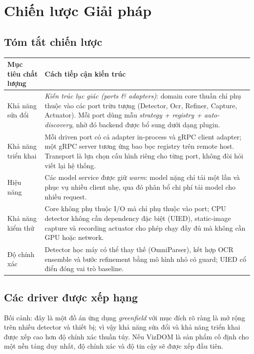 \documentclass[11pt,a4paper]{report}
\begin{document}
\chapter{Chiến lược Giải pháp}
\section{Tóm tắt chiến lược}
\begin{longtable}{@{}p{3.4cm}p{11.2cm}@{}}
\toprule
\textbf{Mục tiêu chất lượng} & \textbf{Cách tiếp cận kiến trúc} \\
\midrule
\endhead
Khả năng sửa đổi & \emph{Kiến trúc lục giác (ports \& adapters)}: domain core thuần chỉ phụ thuộc vào các port trừu tượng (Detector, Ocr, Refiner, Capture, Actuator). Mỗi port dùng mẫu \emph{strategy + registry + auto-discovery}, nhờ đó backend được bổ sung dưới dạng plugin. \\
Khả năng triển khai & Mỗi driven port có cả adapter in-process và gRPC client adapter; một gRPC server tương ứng bao bọc registry trên remote host. Transport là lựa chọn cấu hình riêng cho từng port, không đòi hỏi viết lại hệ thống. \\
Hiệu năng & Các model service được giữ \emph{warm}: model nặng chỉ tải một lần và phục vụ nhiều client nhẹ, qua đó phân bổ chi phí tải model cho nhiều request. \\
Khả năng kiểm thử & Core không phụ thuộc I/O mà chỉ phụ thuộc vào port; CPU detector không cần dependency đặc biệt (UIED), static-image capture và recording actuator cho phép chạy đầy đủ mà không cần GPU hoặc network. \\
Độ chính xác & Detector học máy có thể thay thế (OmniParser), kết hợp OCR ensemble và bước refinement bằng mô hình nhỏ có guard; UIED cổ điển đóng vai trò baseline. \\
\bottomrule
\end{longtable}

\section{Các driver được xếp hạng}
Bối cảnh: đây là một đồ án ứng dụng \emph{greenfield} với mục đích rõ ràng là mở rộng
trên nhiều detector và thiết bị; vì vậy khả năng sửa đổi và khả năng triển khai được xếp
cao hơn độ chính xác thuần túy. Nếu VizDOM là sản phẩm cố định cho một nền tảng duy nhất,
độ chính xác và độ tin cậy sẽ được xếp đầu tiên.
\end{document}
